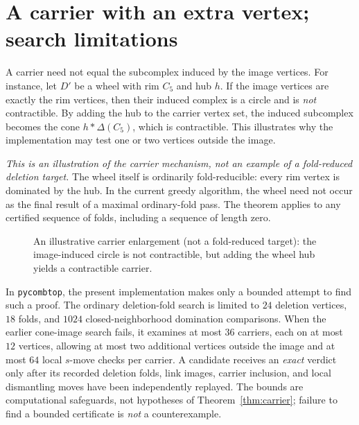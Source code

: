 \documentclass[11pt,letterpaper]{article}
\theoremstyle{definition}
\theoremstyle{remark}
\newcommand{\Del}{\Delta}
\begin{document}
\section{A carrier with an extra vertex; search limitations}
A carrier need not equal the subcomplex induced by the image vertices. For instance, let \(D'\) be a wheel with rim \(C_5\) and hub \(h\). If the image vertices are exactly the rim vertices, then their induced complex is a circle and is \emph{not} contractible. By adding the hub to the carrier vertex set, the induced subcomplex becomes the cone \(h*\Del(C_5)\), which is contractible. This illustrates why the implementation may test one or two vertices outside the image.

\emph{This is an illustration of the carrier mechanism, not an example
of a fold-reduced deletion target.} The wheel itself is ordinarily
fold-reducible: every rim vertex is dominated by the hub. In the
current greedy algorithm, the wheel need not occur as the final
result of a maximal ordinary-fold pass. The theorem applies to any
certified sequence of folds, including a sequence of length zero.

\begin{figure}[htbp]
\centering
{}
\caption{An illustrative carrier enlargement (not a fold-reduced target): the image-induced circle is not contractible, but adding the wheel hub yields a contractible carrier.}
\label{fig:extra}
\end{figure}

In \texttt{pycombtop}, the present implementation makes only a bounded attempt to find such a proof. The ordinary deletion-fold search is limited to \(24\) deletion vertices, \(18\) folds, and \(1024\) closed-neighborhood domination comparisons. When the earlier cone-image search fails, it examines at most \(36\) carriers, each on at most \(12\) vertices, allowing at most two additional vertices outside the image and at most \(64\) local \(s\)-move checks per carrier. A candidate receives an \emph{exact} verdict only after its recorded deletion folds, link images, carrier inclusion, and local dismantling moves have been independently replayed. The bounds are computational safeguards, not hypotheses of Theorem~\ref{thm:carrier}; failure to find a bounded certificate is \emph{not} a counterexample.
\end{document}
